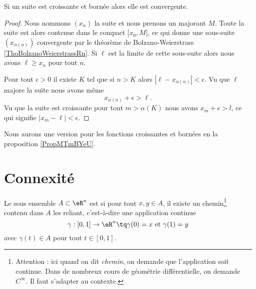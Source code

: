 \begin{corollary}   \label{CorFHbMqGGyi}
    Si un suite est croissante et bornée alors elle est convergente.
\end{corollary}

\begin{proof}
    Nous nommons \( (x_n)\) la suite et nous prenons un majorant \( M\). Toute la suite est alors contenue dans le compact \( \mathopen[ x_0 , M \mathclose]\), ce qui donne une sous-suite \( (x_{\alpha(n)})\) convergente par le théorème de Bolzano-Weierstrass \ref{ThoBolzanoWeierstrassRn}. Si \( \ell\) est la limite de cette sous-suite alors nous avons \( \ell\geq x_n\) pour tout \( n\). 

    Pour tout \( \epsilon>0\) il existe \( K\) tel que si \( n>K\) alors \( | \ell-x_{\alpha(n)} |<\epsilon\). Vu que \( \ell\) majore la suite nous avons même
    \begin{equation}
        x_{\alpha(n)}+\epsilon>\ell.
    \end{equation}
    Vu que la suite est croissante pour tout \( m>\alpha(K)\) nous avons \( x_m+\epsilon>l\), ce qui signifie \( | x_m-\ell |<\epsilon\).
\end{proof}
Nous aurons une version pour les fonctions croissantes et bornées en la proposition \ref{PropMTmBYeU}.

\section{Connexité}

\begin{definition}
  Le sous ensemble $A \subset \eR^n$ est  si pour tout $x, y \in A$, il existe un chemin\footnote{Attention : ici quand on dit \emph{chemin}, on demande que l'application soit continue. Dans de nombreux cours de géométrie différentielle, on demande $ C^{\infty}$. Il faut s'adapter au contexte.} contenu dans $A$ les reliant, c'est-à-dire une application continue
  \begin{equation*}
    \gamma : [0,1] \to \eR^n \tq \gamma(0) = x~\text{et}~\gamma(1) = y
  \end{equation*}
  avec $\gamma(t) \in A$ pour tout $t\in [0,1]$.
\end{definition}

